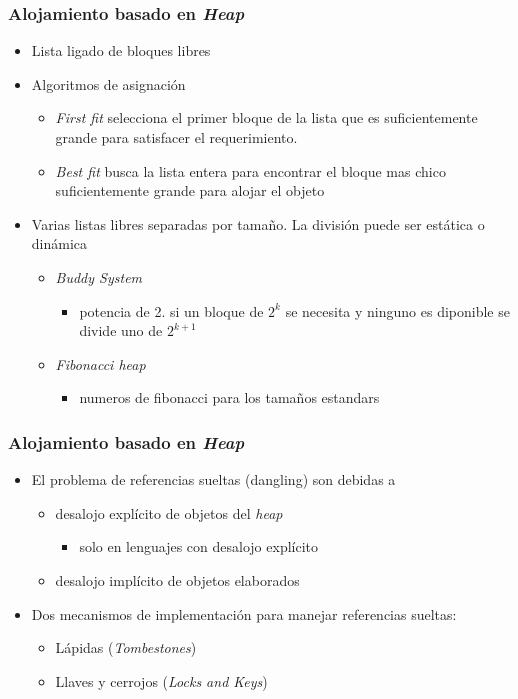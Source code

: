 \documentclass[11pt]{article}
\begin{document}
\subsubsection*{Alojamiento basado en \emph{Heap}}
\label{sec:org1a56da3}
\begin{itemize}
\item Lista ligado de bloques libres
\item Algoritmos de asignación
\begin{itemize}
\item \emph{First fit} selecciona el primer bloque de la lista que es
suficientemente grande para satisfacer el requerimiento.
\item \emph{Best fit} busca la lista entera para encontrar el bloque mas
chico suficientemente grande para alojar el objeto
\end{itemize}
\item Varias listas libres separadas por tamaño. La división puede ser
estática o dinámica
\begin{itemize}
\item \emph{Buddy System} 
\begin{itemize}
\item potencia de 2. si un bloque de \(2^k\) se necesita y ninguno es
diponible se divide uno de \(2^{k+1}\)
\end{itemize}
\item \emph{Fibonacci heap}
\begin{itemize}
\item numeros de fibonacci para los tamaños estandars
\end{itemize}
\end{itemize}
\end{itemize}


\subsubsection*{Alojamiento basado en \emph{Heap}}
\label{sec:org243a95b}
\begin{itemize}
\item El problema de referencias sueltas (dangling) son debidas a
\begin{itemize}
\item desalojo explícito de objetos del \emph{heap}
\begin{itemize}
\item solo en lenguajes con desalojo explícito
\end{itemize}
\item desalojo implícito de objetos elaborados
\end{itemize}
\item Dos mecanismos de implementación para manejar referencias sueltas:
\begin{itemize}
\item Lápidas (\emph{Tombestones})
\item Llaves y cerrojos (\emph{Locks and Keys})
\end{itemize}
\end{itemize}
\end{document}

